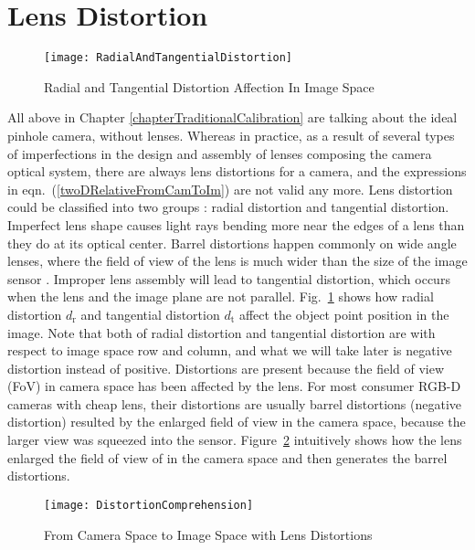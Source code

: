 \section{Lens Distortion}
%
\begin{figure}[b]
\centering
\texttt{[image: RadialAndTangentialDistortion]}
\caption{Radial and Tangential Distortion Affection In Image Space}
\label{RadialAndTangentialDistortion}
\end{figure}%
\indent
All above in Chapter \ref{chapterTraditionalCalibration} are talking about the ideal pinhole camera, without lenses. Whereas in practice, as a result of several types of imperfections in the design and assembly of lenses composing the camera optical system, there are always lens distortions for a camera, and the expressions in eqn.~(\ref{twoDRelativeFromCamToIm}) are not valid any more. Lens distortion could be classified into two groups \cite{distortion1_1992} : radial distortion and tangential distortion. Imperfect lens shape causes light rays bending more near the edges of a lens than they do at its optical center. Barrel distortions happen commonly on wide angle lenses, where the field of view of the lens is much wider than the size of the image sensor \cite{whatisDistortion_2013}. Improper lens assembly will lead to tangential distortion, which occurs when the lens and the image plane are not parallel. Fig.~\ref{RadialAndTangentialDistortion} shows how radial distortion \(d_\text{r}\) and tangential distortion \(d_\text{t}\) affect the object point position in the image. Note that both of radial distortion and tangential distortion are with respect to image space row and column, and what we will take later is negative distortion instead of positive. Distortions are present because the field of view (FoV) in camera space has been affected by the lens. For most consumer RGB-D cameras with cheap lens, their distortions are usually barrel distortions (negative distortion) resulted by the enlarged field  of view in the camera space, because the larger view was squeezed into the sensor. Figure~\ref{DistortionComprehension} intuitively shows how the lens enlarged the field of view of in the camera space and then generates the barrel distortions.
%
\begin{figure}[t]
\centering
\texttt{[image: DistortionComprehension]}
\caption{From Camera Space to Image Space with Lens Distortions}
\label{DistortionComprehension}
\end{figure}%

